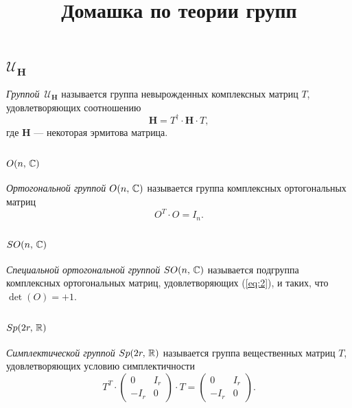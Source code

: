 \documentclass[a4paper,12pt]{article}
\title{Домашка по теории групп}
\begin{document}

\maketitle

\section{}
\subsection{$\mathcal{U}_\mathbf{H}$ }
\begin{dfn}
	\emph{Группой} $\,\mathcal{U}_\mathbf{H}$ называется группа невырожденных
	комплексных матриц $T$, удовлетворяющих соотношению
	\begin{equation}
		\mathbf{H}=T^\dag \cdot \mathbf{H} \cdot T
		\label{eq:1}
	,\end{equation}
	где $\mathbf{H}$ --- некоторая эрмитова матрица.
\end{dfn}
\subsection{$O(n,\, \mathbb{C} )$ }
\begin{dfn}
	\emph{Ортогональной группой $O(n,\,\mathbb{C})$} называется группа комплексных
	ортогональных
	матриц
	\begin{equation}
	O^T \cdot O = I_n
	\label{eq:2}
.\end{equation}
\end{dfn}
\subsection{$SO(n,\, \mathbb{C} )$ }
\begin{dfn}
	\emph{Специальной ортогональной группой $SO(n,\,\mathbb{C})$} называется
	подгруппа комплексных ортогональных
матриц, удовлетворяющих (\ref{eq:2}), и таких, что $\det (O)=+1$.
\end{dfn}
\subsection{$Sp(2r,\, \mathbb{R})$ }
\begin{dfn}
	\emph{Симплектической группой $Sp(2r,\, \mathbb{R})$ } называется группа
	вещественных матриц $T$,
		удовлетворяющих условию симплектичности
	\begin{equation}
		T^T \cdot \begin{pmatrix} 0 & I_{r} \\ -I_{r} & 0 \end{pmatrix} 
		\cdot T= \begin{pmatrix} 0 & I_{r} \\ -I_{r} & 0 \end{pmatrix} 
		\label{eq:3}
	.\end{equation}

\end{dfn}
\end{document}
